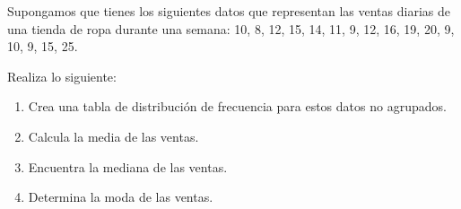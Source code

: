 \begin{exercise}
    Supongamos que tienes los siguientes datos que representan las ventas diarias de una tienda de ropa durante una semana:
    10, 8, 12, 15, 14, 11, 9, 12, 16, 19, 20, 9, 10, 9, 15, 25.

    Realiza lo siguiente:
    \begin{enumerate}
        \item Crea una tabla de distribución de frecuencia para estos datos no agrupados.
        \item Calcula la media de las ventas.
        \item Encuentra la mediana de las ventas.
        \item Determina la moda de las ventas.
    \end{enumerate}
\end{exercise}
